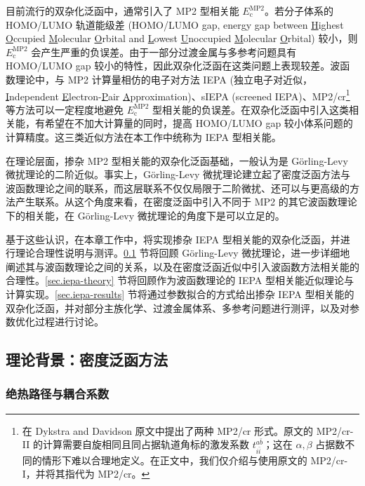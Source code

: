 目前流行的双杂化泛函中，通常引入了 MP2 型相关能 $E_\mathrm{c}^\mathrm{MP2}$。若分子体系的 HOMO/LUMO 轨道能级差 (HOMO/LUMO gap, energy gap between \underline{H}ighest \underline{O}ccupied \underline{M}olecular \underline{O}rbital and \underline{L}owest \underline{U}noccupied \underline{M}olecular \underline{O}rbital) 较小，则 $E_\mathrm{c}^\mathrm{MP2}$ 会产生严重的负误差。由于一部分过渡金属与多参考问题具有 HOMO/LUMO gap 较小的特性，因此双杂化泛函在这类问题上表现较差。波函数理论中，与 MP2 计算量相仿的电子对方法 IEPA (独立电子对近似，\underline{I}ndependent \underline{E}lectron-\underline{P}air \underline{A}pproximation)\cite{Sinanoǧlu-Sinanoǧlu.ACP.1964, Nesbet-Nesbet.ACP.1965}、sIEPA (screened IEPA)\cite{Zhang-Scheffler.PRL.2016}、MP2/cr\cite{Dykstra-Davidson.IJQC.2000}\footnote{在 Dykstra and Davidson 原文\cite{Dykstra-Davidson.IJQC.2000}中提出了两种 MP2/cr 形式。原文的 MP2/cr-II 的计算需要自旋相同且同占据轨道角标的激发系数 $t_{i \bar i}^{a \bar b}$；这在 $\alpha, \beta$ 占据数不同的情形下难以合理地定义。在正文中，我们仅介绍与使用原文的 MP2/cr-I，并将其指代为 MP2/cr。} 等方法可以一定程度地避免 $E_\mathrm{c}^\mathrm{MP2}$ 型相关能的负误差。在双杂化泛函中引入这类相关能，有希望在不加大计算量的同时，提高 HOMO/LUMO gap 较小体系问题的计算精度。这三类近似方法在本工作中统称为 IEPA 型相关能。

在理论层面，掺杂 MP2 型相关能的双杂化泛函基础，一般认为是 G\"orling-Levy 微扰理论的二阶近似。事实上，G\"orling-Levy 微扰理论建立起了密度泛函方法与波函数理论之间的联系，而这层联系不仅仅局限于二阶微扰、还可以与更高级的方法产生联系。从这个角度来看，在密度泛函中引入不同于 MP2 的其它波函数理论下的相关能，在 G\"orling-Levy 微扰理论的角度下是可以立足的。

基于这些认识，在本章工作中，将实现掺杂 IEPA 型相关能的双杂化泛函，并进行理论合理性说明与测评。\ref{sec.iepa-gl-perturb} 节将回顾 G\"orling-Levy 微扰理论，进一步详细地阐述其与波函数理论之间的关系，以及在密度泛函近似中引入波函数方法相关能的合理性。\ref{sec.iepa-theory} 节将回顾作为波函数理论的 IEPA 型相关能近似理论与计算实现。\ref{sec.iepa-results} 节将通过参数拟合的方式给出掺杂 IEPA 型相关能的双杂化泛函，并对部分主族化学、过渡金属体系、多参考问题进行测评，以及对参数优化过程进行讨论。

\subsection{理论背景：密度泛函方法}
\label{sec.iepa-gl-perturb}

\subsubsection{绝热路径与耦合系数}

